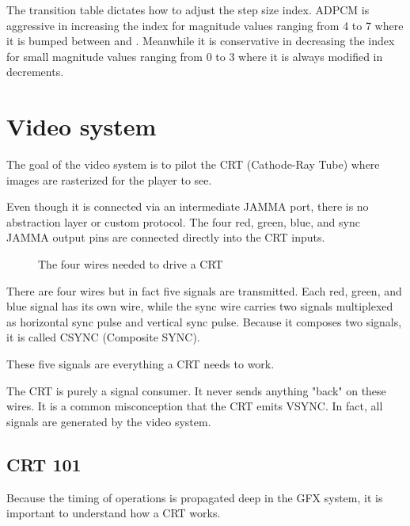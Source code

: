 



The transition table dictates how to adjust the step size index. ADPCM is aggressive in increasing the index for magnitude values ranging from 4 to 7 where it is bumped between  and . Meanwhile it is conservative in decreasing the index for small magnitude values ranging from 0 to 3 where it is always modified in  decrements.








\pagebreak
\section{Video system}
The goal of the video system is to pilot the CRT (Cathode-Ray Tube) where images are rasterized for the player to see.

Even though it is connected via an intermediate JAMMA port, there is no abstraction layer or custom protocol. The four red, green, blue, and sync JAMMA output pins are connected directly into the CRT inputs.

\begin{figure}[H]
\caption*{The four wires needed to drive a CRT}
\end{figure}


There are four wires but in fact five signals are transmitted. Each red, green, and blue signal has its own wire, while the sync wire carries two signals multiplexed as horizontal sync pulse and vertical sync pulse. Because it composes two signals, it is called CSYNC (Composite SYNC). 

These five signals are everything a CRT needs to work. 

\begin{trivia} The CRT is purely a signal consumer. It never sends anything "back" on these wires. It is a common misconception that the CRT emits VSYNC. In fact, all signals are generated by the video system.
\end{trivia}


\subsection{CRT 101}

Because the timing of operations is propagated deep in the GFX system, it is important to understand how a CRT works.

